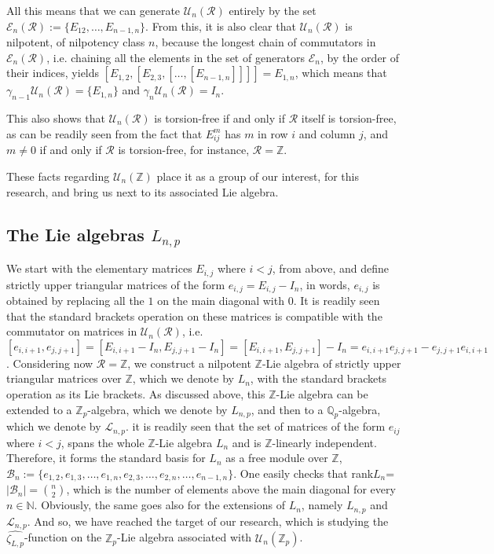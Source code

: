 \documentclass[12pt]{article}
\begin{document}
All this means that we can generate $\mathcal{U}_n(\mathcal{R})$ entirely by the set $\mathcal{E}_n(\mathcal{R}):=\{E_{12},\dots,E_{n-1,n}\}$. From this, it is also clear that $\mathcal{U}_n(\mathcal{R})$ is nilpotent, of nilpotency class $n$, because the longest chain of commutators in $\mathcal{E}_n(\mathcal{R})$, i.e. chaining all the elements in the set of generators $\mathcal{E}_n$, by the order of their indices, yields $[E_{1,2},[E_{2,3},[\dots,[E_{n-1,n}]]]]=E_{1,n}$, which means that $\gamma_{n-1}\mathcal{U}_n(\mathcal{R})=\{E_{1,n}\}$ and $\gamma_n \mathcal{U}_n(\mathcal{R})=I_n$.\par
This also shows that $\mathcal{U}_n(\mathcal{R})$ is torsion-free if and only if $\mathcal{R}$ itself is torsion-free, as can be readily seen from the fact that $E_{ij}^m$ has $m$ in row $i$ and column $j$, and $m\neq 0$ if and only if $\mathcal{R}$ is torsion-free, for instance, $\mathcal{R}=\mathbb{Z}$.\par
These facts regarding $\mathcal{U}_n(\mathbb{Z})$ place it as a group of our interest, for this research, and bring us next to its associated Lie algebra.
\subsection{The Lie algebras $L_{n,p}$}
We start with the elementary matrices $E_{i,j}$ where $i<j$, from above, and define strictly upper triangular matrices of the form $e_{i,j}=E_{i,j}-I_n$, in words, $e_{i,j}$ is obtained by replacing all the $1$ on the main diagonal with $0$. It is readily seen that the standard brackets operation on these matrices is compatible with the commutator on matrices in $\mathcal{U}_n(\mathcal{R})$, i.e. $[e_{i,i+1},e_{j,j+1}]=[E_{i,i+1}-I_n,E_{j,j+1}-I_n]=[E_{i,i+1},E_{j,j+1}]-I_n=e_{i,i+1}e_{j,j+1}-e_{j,j+1}e_{i,i+1}$. Considering now $\mathcal{R}=\mathbb{Z}$, we construct a nilpotent $\mathbb{Z}$-Lie algebra of strictly upper triangular matrices over $\mathbb{Z}$, which we denote by $L_n$, with the standard brackets operation as its Lie brackets. As discussed above, this $\mathbb{Z}$-Lie algebra can be extended to a $\mathbb{Z}_p$-algebra, which we denote by $L_{n,p}$, and then to a $\mathbb{Q}_p$-algebra, which we denote by $\mathcal{L}_{n,p}$.
it is readily seen that the set of matrices of the form $e_{ij}$ where $i<j$, spans the whole $\mathbb{Z}$-Lie algebra $L_n$ and is $\mathbb{Z}$-linearly independent. Therefore, it forms the standard basis for $L_n$ as a free module over $\mathbb{Z}$, $\mathcal{B}_n:=\{e_{1,2},e_{1,3},\dots,e_{1,n},e_{2,3},\dots,e_{2,n},\dots,e_{n-1,n}\}$. One easily checks that rank$L_n$=$|\mathcal{B}_n|=\binom{n}{2}$, which is the number of elements above the main diagonal for every $n\in\mathbb{N}$. Obviously, the same goes also for the extensions of $L_n$, namely $L_{n,p}$ and $\mathcal{L}_{n,p}$. And so, we have reached the target of our research, which is studying the $\hat{\zeta_{L,p}}$-function on the $\mathbb{Z}_p$-Lie algebra associated with $\mathcal{U}_n(\mathbb{Z}_p)$.
\end{document}
